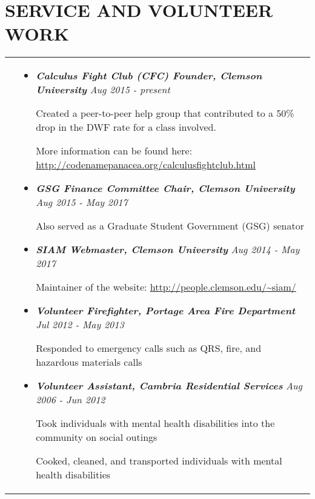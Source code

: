 \documentclass[10pt]{article}
\begin{document}
\section{\textbf{SERVICE AND VOLUNTEER WORK}}
\vspace*{-\baselineskip}
\hskip-1.7in
\begin{tabularx}{1.5\linewidth}{>{\raggedleft\scshape}p{3cm}X}

  &\begin{itemize}
    \setlength\itemsep{.005em}      
     \item \textbf{\textit{Calculus Fight Club (CFC) Founder, Clemson University}}    \hspace{22 mm}\textit{Aug 2015 - present}
  
   
Created a peer-to-peer help group that contributed to a 50\% drop in the DWF rate for a class involved.

More information can be found here:  \url{http://codenamepanacea.org/calculusfightclub.html}
    
                             \item \textbf{\textit{GSG Finance Committee Chair, Clemson University}}    \hspace{30 mm}\textit{Aug 2015 - May 2017}
  
   
   Also served as a Graduate Student Government (GSG) senator
                    
    
\item \textbf{\textit{SIAM Webmaster, Clemson University}} \hspace{54 mm}\textit{Aug 2014 - May 2017 }
  
    Maintainer of the website: \url{http://people.clemson.edu/~siam/}
                 
             
\item \textbf{\textit{Volunteer Firefighter, Portage Area Fire Department}} \hspace{30 mm}\textit{Jul 2012 - May 2013}
  
   Responded to emergency calls such as QRS, fire, and hazardous materials calls

  \item \textbf{\textit{Volunteer Assistant, Cambria Residential Services}}    \hspace{34.5 mm}\textit{Aug 2006 - Jun 2012}
  
   Took individuals with mental health disabilities into the community on social outings
   
   Cooked, cleaned, and transported individuals with mental health disabilities
          
  \end{itemize} 

\end{tabularx}
\end{document}
